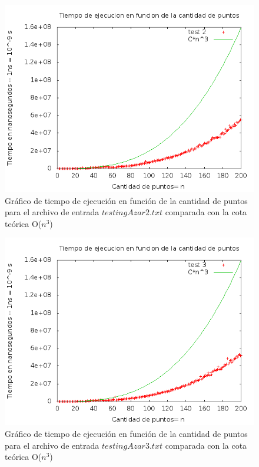 \begin{figure}[H]
	\centering
	\includegraphics[scale=0.6]{ej3-test2.png}
	\caption{ Gr\'afico de tiempo de ejecuci\'on en funci\'on de la cantidad de puntos para el archivo de entrada $testingAzar2.txt$ comparada con la cota te\'orica O($n^3$)}
\end{figure}

\begin{figure}[H]
	\centering
	\includegraphics[scale=0.6]{ej3-test3.png}
	\caption{ Gr\'afico de tiempo de ejecuci\'on en funci\'on de la cantidad de puntos para el archivo de entrada $testingAzar3.txt$ comparada con la cota te\'orica O($n^3$)}
\end{figure}

